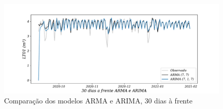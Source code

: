 \begin{figure}[H]
	\centering
	\caption{Comparação dos modelos ARMA e ARIMA, 30 dias à frente }
	\label{fig:60-ARMA-ARIMA24}
	\includegraphics[width=1\linewidth]{Apendices/Figuras/modelagem-24h/30-ARMA-ARIMA}
	
\end{figure}